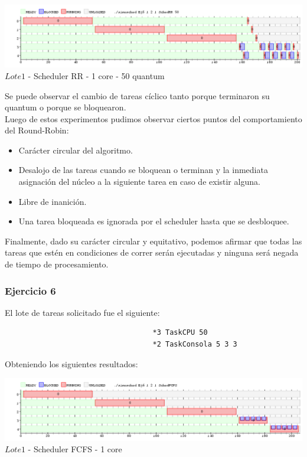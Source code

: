 \begin{center}
  	\includegraphics[width=450pt]{./Test/ej5_50.png}
	  {$Lote 1$ - Scheduler RR - 1 core - 50 quantum}	
\end{center}

\indent Se puede observar el cambio de tareas cíclico tanto porque terminaron su quantum o porque se bloquearon.\\


\indent Luego de estos experimentos pudimos observar ciertos puntos del comportamiento del Round-Robin:\\
\begin{itemize}
\item  Carácter circular del algoritmo.
\item  Desalojo de las tareas cuando se bloquean o terminan y la inmediata asignación del núcleo a la siguiente tarea en caso de existir alguna.
\item  Libre de inanición.
\item  Una tarea bloqueada es ignorada por el scheduler hasta que se desbloquee.
\end{itemize}

\indent Finalmente, dado su carácter circular y equitativo, podemos afirmar que todas las tareas que 
estén en condiciones de correr serán ejecutadas y ninguna será negada de tiempo de procesamiento.\\


\subsubsection[Resolución Ejercicio 5]{Ejercicio 6}

El lote de tareas solicitado fue el siguiente:
\begin{verbatim}
                                   *3 TaskCPU 50
                                   *2 TaskConsola 5 3 3
\end{verbatim}

Obteniendo los siguientes resultados:

\begin{center}
  	\includegraphics[width=450pt]{./Test/ej6.png}
	  {$Lote 1$ - Scheduler FCFS - 1 core}	
\end{center}

